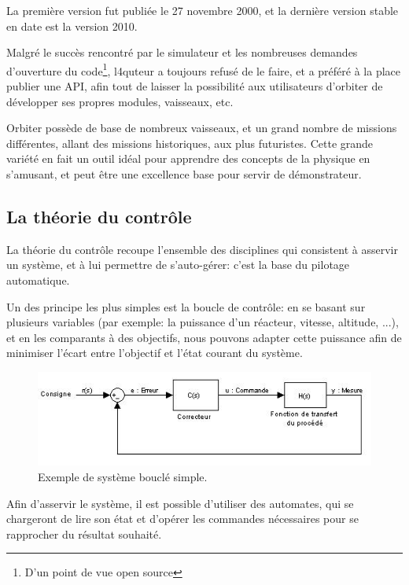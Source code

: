 \documentclass[a4paper,11pt]{article}
\begin{document}
        La première version fut publiée le 27 novembre 2000, et la dernière version stable en date est la version 2010.

        Malgré le succès rencontré par le simulateur et les nombreuses demandes d'ouverture du code\footnote{D'un point de vue open source}, l4quteur a toujours refusé de le faire, et a préféré à la place publier une API, afin tout de laisser la possibilité aux utilisateurs d'orbiter de développer ses propres modules, vaisseaux, etc.

        Orbiter possède de base de nombreux vaisseaux, et un grand nombre de missions différentes, allant des missions historiques, aux plus futuristes. Cette grande variété en fait un outil idéal pour apprendre des concepts de la physique en s'amusant, et peut être une excellence base pour servir de démonstrateur.

    \subsection{La théorie du contrôle}
        La théorie du contrôle recoupe l'ensemble des disciplines qui consistent à asservir un système, et à lui permettre de s'auto-gérer: c'est la base du pilotage automatique.

        Un des principe les plus simples est la boucle de contrôle: en se basant sur plusieurs variables (par exemple: la puissance d'un réacteur, vitesse, altitude, ...), et en les comparants à des objectifs, nous pouvons adapter cette puissance afin de minimiser l'écart entre l'objectif et l'état courant du système.

        \begin{figure}[!h]
            \begin{center}
                \includegraphics[width=1\textwidth]{img/boucle_controle.jpg}
                \caption{Exemple de système bouclé simple.}
            \end{center}
        \end{figure}
        
        Afin d'asservir le système, il est possible d'utiliser des automates, qui se chargeront de lire son état et d'opérer les commandes nécessaires pour se rapprocher du résultat souhaité.
\end{document}
